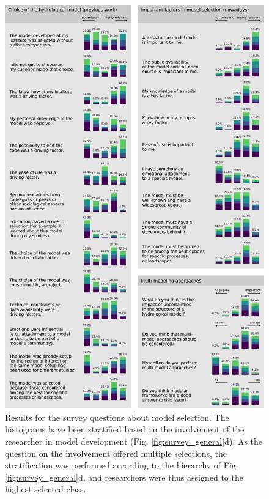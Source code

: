 \documentclass[10pt,a4paper]{article}
\begin{document}
\begin{figure}[htbp]
	\begin{center}
		\includegraphics[width=0.90\columnwidth]{figures/survey_histograms.pdf}
		\caption{{Results for the survey questions about model selection. The histograms have been stratified based on the involvement of the researcher in model development (Fig. \ref{fig:survey_general}d). As the question on the involvement offered multiple selections, the stratification was performed according to the hierarchy of Fig. \ref{fig:survey_general}d, and researchers were thus assigned to the highest selected class. 
		{\label{fig:survey_histograms}}
		}}
	\end{center}
\end{figure}
\end{document}
